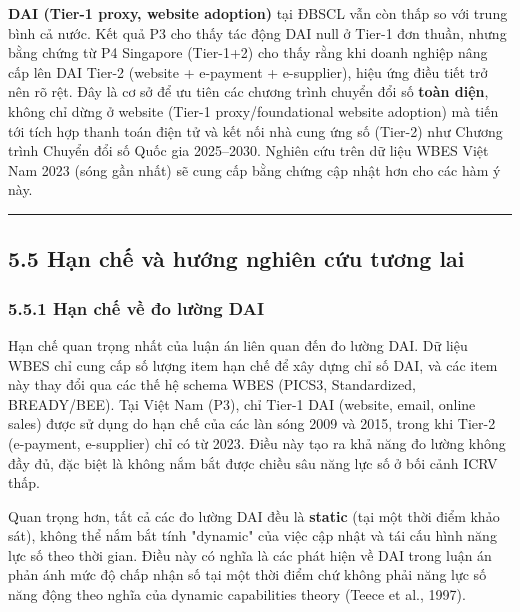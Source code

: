 \documentclass[12pt,a4paper]{article}
\begin{document}
\textbf{DAI (Tier-1 proxy, website adoption)} tại ĐBSCL vẫn còn thấp so
với trung bình cả nước. Kết quả P3 cho thấy tác động DAI null ở Tier-1
đơn thuần, nhưng bằng chứng từ P4 Singapore (Tier-1+2) cho thấy rằng khi
doanh nghiệp nâng cấp lên DAI Tier-2 (website + e-payment + e-supplier),
hiệu ứng điều tiết trở nên rõ rệt. Đây là cơ sở để ưu tiên các chương
trình chuyển đổi số \textbf{toàn diện}, không chỉ dừng ở website (Tier-1
proxy/foundational website adoption) mà tiến tới tích hợp thanh toán
điện tử và kết nối nhà cung ứng số (Tier-2) như Chương trình Chuyển đổi
số Quốc gia 2025--2030. Nghiên cứu trên dữ liệu WBES Việt Nam 2023 (sóng
gần nhất) sẽ cung cấp bằng chứng cập nhật hơn cho các hàm ý này.

\begin{center}\rule{0.5\linewidth}{0.5pt}\end{center}

\hypertarget{55-hux1ea1n-chux1ebf-vuxe0-hux1b0ux1edbng-nghiuxean-cux1ee9u-tux1b0ux1a1ng-lai}{%
\subsection{5.5 Hạn chế và hướng nghiên cứu tương
lai}\label{55-hux1ea1n-chux1ebf-vuxe0-hux1b0ux1edbng-nghiuxean-cux1ee9u-tux1b0ux1a1ng-lai}}

\hypertarget{551-hux1ea1n-chux1ebf-vux1ec1-ux111o-lux1b0ux1eddng-dai}{%
\subsubsection{5.5.1 Hạn chế về đo lường
DAI}\label{551-hux1ea1n-chux1ebf-vux1ec1-ux111o-lux1b0ux1eddng-dai}}

Hạn chế quan trọng nhất của luận án liên quan đến đo lường DAI. Dữ liệu
WBES chỉ cung cấp số lượng item hạn chế để xây dựng chỉ số DAI, và các
item này thay đổi qua các thế hệ schema WBES (PICS3, Standardized,
BREADY/BEE). Tại Việt Nam (P3), chỉ Tier-1 DAI (website, email, online
sales) được sử dụng do hạn chế của các làn sóng 2009 và 2015, trong khi
Tier-2 (e-payment, e-supplier) chỉ có từ 2023. Điều này tạo ra khả năng
đo lường không đầy đủ, đặc biệt là không nắm bắt được chiều sâu năng lực
số ở bối cảnh ICRV thấp.

Quan trọng hơn, tất cả các đo lường DAI đều là \textbf{static} (tại một
thời điểm khảo sát), không thể nắm bắt tính "dynamic" của việc cập nhật
và tái cấu hình năng lực số theo thời gian. Điều này có nghĩa là các
phát hiện về DAI trong luận án phản ánh mức độ chấp nhận số tại một thời
điểm chứ không phải năng lực số năng động theo nghĩa của dynamic
capabilities theory (Teece et al., 1997).
\end{document}
